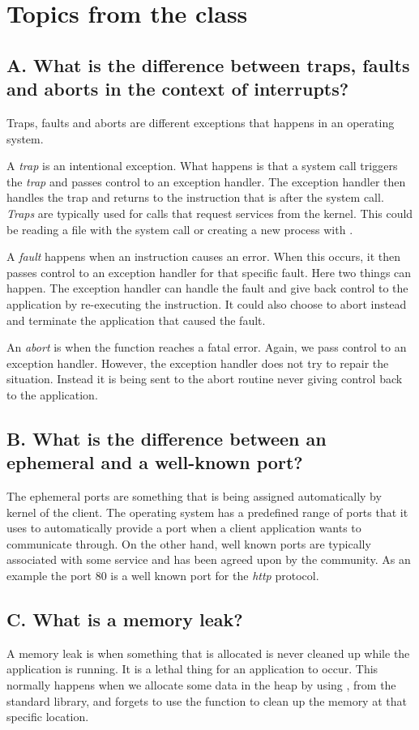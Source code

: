 \section{Topics from the class}

\subsection{A. What is the difference between traps, faults and aborts in the context of interrupts?}
Traps, faults and aborts are different exceptions that happens in an operating system.

A \textit{trap} is an intentional exception. What happens is that a system call triggers the \textit{trap} and passes control 
to an exception handler. The exception handler then handles the trap and returns to the instruction that is after the system call.
\textit{Traps} are typically used for calls that request services from the kernel. This could be reading a file with the system call 
or creating a new process with .

A \textit{fault} happens when an instruction causes an error. When this occurs, it then passes control to an exception handler for that specific fault.
Here two things can happen. The exception handler can handle the fault and give back control to the application by re-executing the instruction. 
It could also choose to abort instead and terminate the application that caused the fault.

An \textit{abort} is when the function reaches a fatal error. Again, we pass control to an exception handler.
However, the exception handler does not try to repair the situation. Instead it is being sent to the abort routine 
never giving control back to the application.

\subsection{B. What is the difference between an ephemeral and a well-known port?}
The ephemeral ports are something that is being assigned automatically by kernel of the client. The operating system has a predefined range of ports that it uses to automatically provide a port when a client application wants to communicate through. 
On the other hand, well known ports are typically associated with some service and has been 
agreed upon by the community. As an example the port 80 is a well known port for the \textit{http} protocol.

\subsection{C. What is a memory leak?}
A memory leak is when something that is allocated is never cleaned up while the application is running. 
It is a lethal thing for an application to occur. This normally happens when we allocate some data in the heap
by using , from the standard library, and forgets to use the function  to clean up the memory
at that specific location.

